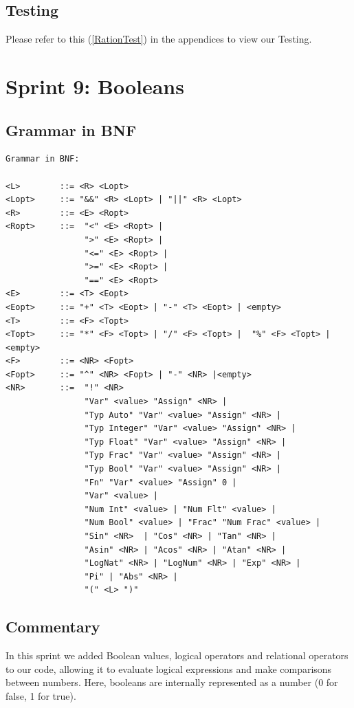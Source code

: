 \documentclass[a4paper, oneside, 11pt]{report}
\begin{document}
\subsection{Testing}
Please refer to this (\ref{RationTest}) in the appendices to view our Testing. \\


\clearpage
\section{Sprint 9: Booleans }
\subsection{Grammar in BNF}
\begin{verbatim}
Grammar in BNF:

<L>        ::= <R> <Lopt>
<Lopt>     ::= "&&" <R> <Lopt> | "||" <R> <Lopt> 
<R>        ::= <E> <Ropt>
<Ropt>     ::=  "<" <E> <Ropt> | 
                ">" <E> <Ropt> |  
                "<=" <E> <Ropt> | 
                ">=" <E> <Ropt> |
                "==" <E> <Ropt>
<E>        ::= <T> <Eopt>
<Eopt>     ::= "+" <T> <Eopt> | "-" <T> <Eopt> | <empty>
<T>        ::= <F> <Topt>
<Topt>     ::= "*" <F> <Topt> | "/" <F> <Topt> |  "%" <F> <Topt> |<empty>
<F>        ::= <NR> <Fopt>
<Fopt>     ::= "^" <NR> <Fopt> | "-" <NR> |<empty> 
<NR>       ::=  "!" <NR>
                "Var" <value> "Assign" <NR> |
                "Typ Auto" "Var" <value> "Assign" <NR> |
                "Typ Integer" "Var" <value> "Assign" <NR> |
                "Typ Float" "Var" <value> "Assign" <NR> |
                "Typ Frac" "Var" <value> "Assign" <NR> |
                "Typ Bool" "Var" <value> "Assign" <NR> |
                "Fn" "Var" <value> "Assign" 0 |
                "Var" <value> |
                "Num Int" <value> | "Num Flt" <value> |
                "Num Bool" <value> | "Frac" "Num Frac" <value> |
                "Sin" <NR>  | "Cos" <NR> | "Tan" <NR> |
                "Asin" <NR> | "Acos" <NR> | "Atan" <NR> |
                "LogNat" <NR> | "LogNum" <NR> | "Exp" <NR> |
                "Pi" | "Abs" <NR> |
                "(" <L> ")"
\end{verbatim}
\subsection{Commentary}
In this sprint we added Boolean values, logical operators and relational operators to our code, allowing it to evaluate logical expressions and make comparisons between numbers. Here, booleans are internally represented as a number (0 for false, 1 for true).
\end{document}
